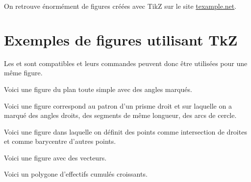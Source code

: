 \begin{info}
On retrouve énormément de figures créées avec TikZ sur le site \href{http://www.texample.net/tikz/examples/}{texample.net}.
\end{info}


\section{Exemples de figures utilisant TkZ}


\begin{info}
Les   et  sont compatibles et leurs commandes peuvent donc être utilisées pour une même figure.
\end{info}

Voici une figure du plan toute simple avec des angles marqués.


\medskip

\medskip

Voici une figure correspond au patron d'un prisme droit et sur laquelle on a marqué des angles droits, des segments de même longueur, des arcs de cercle.


\medskip

\medskip

Voici une figure dans laquelle on définit des points comme intersection de droites et comme barycentre d'autres points.


\medskip

\medskip

Voici une figure avec des vecteurs.


\medskip

\medskip

Voici un polygone d'effectifs cumulés croissants.

